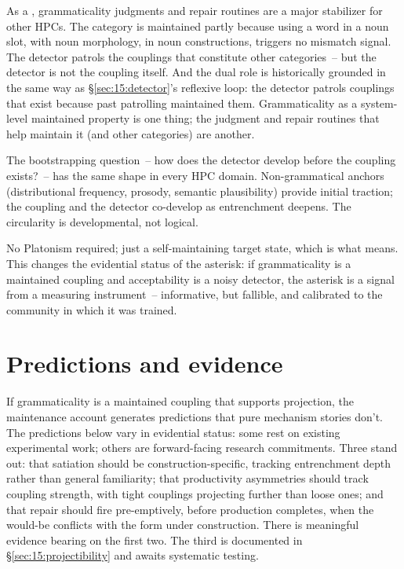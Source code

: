 As a , grammaticality judgments and repair routines are a major stabilizer for other HPCs. The category  is maintained partly because using a word in a noun slot, with noun morphology, in noun constructions, triggers no mismatch signal. The detector patrols the couplings that constitute other categories~-- but the detector is not the coupling itself. And the dual role is historically grounded in the same way as §\ref{sec:15:detector}'s reflexive loop: the detector patrols couplings that exist because past patrolling maintained them. Grammaticality as a system-level maintained property is one thing; the judgment and repair routines that help maintain it (and other categories) are another.

The bootstrapping question~-- how does the detector develop before the coupling exists?~-- has the same shape in every HPC domain. Non-grammatical anchors (distributional frequency, prosody, semantic plausibility) provide initial traction; the coupling and the detector co-develop as entrenchment deepens. The circularity is developmental, not logical.

No Platonism required; just a self-maintaining target state, which is what  means. This changes the evidential status of the asterisk: if grammaticality is a maintained coupling and acceptability is a noisy detector, the asterisk is a signal from a measuring instrument~-- informative, but fallible, and calibrated to the community in which it was trained.


\section{Predictions and evidence}
\label{sec:15:predictions}

If grammaticality is a maintained coupling that supports projection, the maintenance account generates predictions that pure mechanism stories don't. The predictions below vary in evidential status: some rest on existing experimental work; others are forward-facing research commitments. Three stand out: that satiation should be construction-specific, tracking entrenchment depth rather than general familiarity; that productivity asymmetries should track coupling strength, with tight couplings projecting further than loose ones; and that repair should fire pre-emptively, before production completes, when the would-be conflicts with the form under construction. There is meaningful evidence bearing on the first two. The third is documented in §\ref{sec:15:projectibility} and awaits systematic testing.

